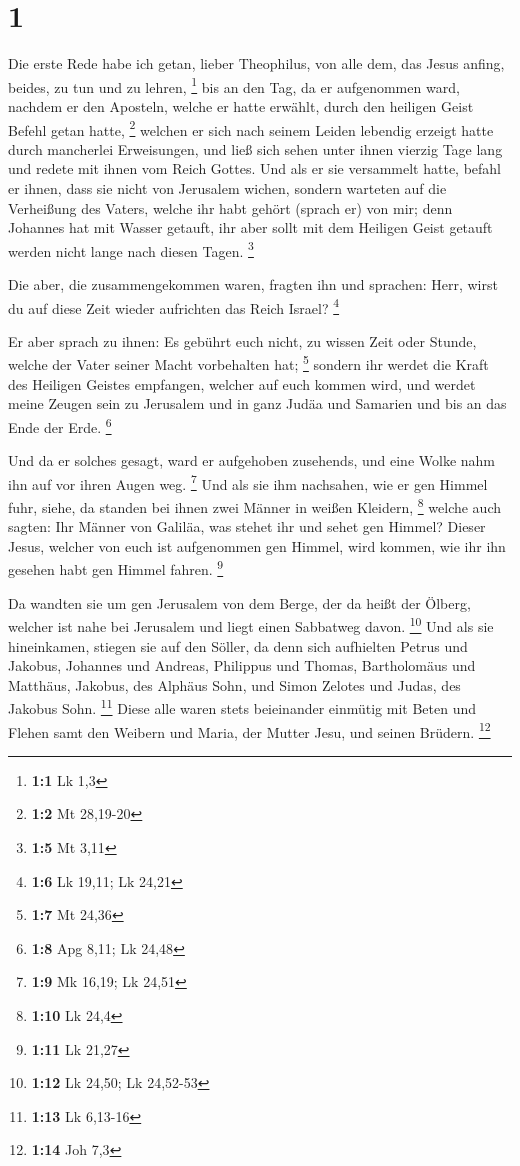 \hypertarget{section}{%
\section{1}\label{section}}

 Die erste Rede habe ich getan, lieber Theophilus, von alle
dem, das Jesus anfing, beides, zu tun und zu lehren, \footnote{\textbf{1:1}
  Lk 1,3}  bis an den Tag, da er aufgenommen ward, nachdem
er den Aposteln, welche er hatte erwählt, durch den heiligen Geist
Befehl getan hatte, \footnote{\textbf{1:2} Mt 28,19-20} 
welchen er sich nach seinem Leiden lebendig erzeigt hatte durch
mancherlei Erweisungen, und ließ sich sehen unter ihnen vierzig Tage
lang und redete mit ihnen vom Reich Gottes.  Und als er sie
versammelt hatte, befahl er ihnen, dass sie nicht von Jerusalem wichen,
sondern warteten auf die Verheißung des Vaters, welche ihr habt gehört
(sprach er) von mir;  denn Johannes hat mit Wasser getauft,
ihr aber sollt mit dem Heiligen Geist getauft werden nicht lange nach
diesen Tagen. \footnote{\textbf{1:5} Mt 3,11}

 Die aber, die zusammengekommen waren, fragten ihn und
sprachen: Herr, wirst du auf diese Zeit wieder aufrichten das Reich
Israel? \footnote{\textbf{1:6} Lk 19,11; Lk 24,21}

 Er aber sprach zu ihnen: Es gebührt euch nicht, zu wissen
Zeit oder Stunde, welche der Vater seiner Macht vorbehalten hat;
\footnote{\textbf{1:7} Mt 24,36}  sondern ihr werdet die
Kraft des Heiligen Geistes empfangen, welcher auf euch kommen wird, und
werdet meine Zeugen sein zu Jerusalem und in ganz Judäa und Samarien und
bis an das Ende der Erde. \footnote{\textbf{1:8} Apg 8,11; Lk 24,48}

 Und da er solches gesagt, ward er aufgehoben zusehends, und
eine Wolke nahm ihn auf vor ihren Augen weg. \footnote{\textbf{1:9} Mk
  16,19; Lk 24,51}  Und als sie ihm nachsahen, wie er gen
Himmel fuhr, siehe, da standen bei ihnen zwei Männer in weißen Kleidern,
\footnote{\textbf{1:10} Lk 24,4}  welche auch sagten: Ihr
Männer von Galiläa, was stehet ihr und sehet gen Himmel? Dieser Jesus,
welcher von euch ist aufgenommen gen Himmel, wird kommen, wie ihr ihn
gesehen habt gen Himmel fahren. \footnote{\textbf{1:11} Lk 21,27}

 Da wandten sie um gen Jerusalem von dem Berge, der da
heißt der Ölberg, welcher ist nahe bei Jerusalem und liegt einen
Sabbatweg davon. \footnote{\textbf{1:12} Lk 24,50; Lk 24,52-53}
 Und als sie hineinkamen, stiegen sie auf den Söller, da
denn sich aufhielten Petrus und Jakobus, Johannes und Andreas, Philippus
und Thomas, Bartholomäus und Matthäus, Jakobus, des Alphäus Sohn, und
Simon Zelotes und Judas, des Jakobus Sohn. \footnote{\textbf{1:13} Lk
  6,13-16}  Diese alle waren stets beieinander einmütig mit
Beten und Flehen samt den Weibern und Maria, der Mutter Jesu, und seinen
Brüdern. \footnote{\textbf{1:14} Joh 7,3}

